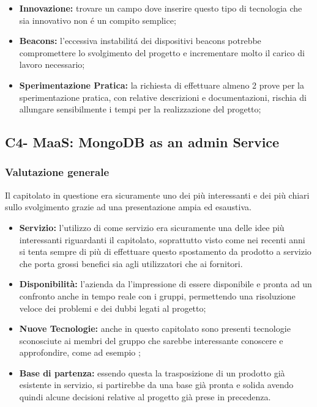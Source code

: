 \begin{itemize}
	\item \textbf{Innovazione:} trovare un campo dove inserire questo tipo di tecnologia che sia innovativo non \'e un compito semplice;
\end{itemize}

\begin{itemize}
	\item \textbf{Beacons:} l'eccessiva instabilit\'a dei dispositivi beacons potrebbe compromettere lo svolgimento del progetto e incrementare molto il carico di lavoro necessario;
\end{itemize}

\begin{itemize}
	\item \textbf{Sperimentazione Pratica:} la richiesta di effettuare almeno 2 prove per la sperimentazione pratica, con relative descrizioni e documentazioni, rischia di allungare sensibilmente i tempi per la realizzazione del progetto;
\end{itemize}



\subsection{C4- MaaS: MongoDB as an admin Service}
\subsubsection{Valutazione generale}

Il capitolato in questione era sicuramente uno dei più interessanti e dei più chiari sullo svolgimento grazie ad una presentazione ampia ed esaustiva.
 \begin{itemize}
	\item \textbf{Servizio:} l'utilizzo di  come servizio era sicuramente una delle idee più interessanti riguardanti il capitolato, soprattutto visto come nei recenti anni si tenta sempre di più di effettuare questo spostamento da prodotto a servizio che porta grossi benefici sia agli utilizzatori che ai fornitori.
	\item\textbf{Disponibilità:} l'azienda da l'impressione di essere disponibile e pronta ad un confronto anche in tempo reale con i gruppi, permettendo una risoluzione veloce dei problemi e dei dubbi legati al progetto;
	\item \textbf{Nuove Tecnologie:} anche in questo capitolato sono presenti tecnologie sconosciute ai membri del gruppo che sarebbe interessante conoscere e approfondire, come ad esempio ;
	\item \textbf{Base di partenza:} essendo questa la trasposizione di un prodotto già esistente in servizio, si partirebbe da una base già pronta e solida avendo quindi alcune decisioni relative al progetto già prese in precedenza.
\end{itemize}

